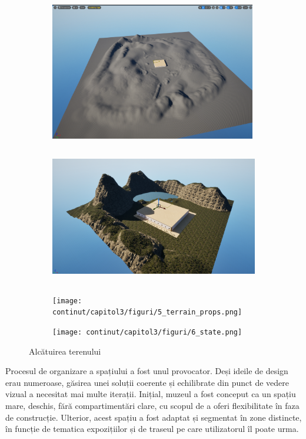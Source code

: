 \begin{figure}[h!]
    \centering
    \begin{subfigure}{0.49\textwidth}
        \includegraphics[width=\linewidth, height=6cm]{continut/capitol3/figuri/3_terrain_mapping.png}
        \label{fig:Terrain mapping}
    \end{subfigure}
    \hfill
    \begin{subfigure}{0.49\textwidth}
        \includegraphics[width=\linewidth, height=6cm]{continut/capitol3/figuri/4_terrain_texture.png}
        \label{fig:Terrain mapping}
    \end{subfigure}
    \begin{subfigure}{0.49\textwidth}
        \texttt{[image: continut/capitol3/figuri/5\_terrain\_props.png]}
        \label{fig:Terrain mapping}
    \end{subfigure}
    \begin{subfigure}{0.49\textwidth}
        \texttt{[image: continut/capitol3/figuri/6\_state.png]}
        \label{fig:Terrain mapping}
    \end{subfigure}

    \caption{Alcătuirea terenului}
\end{figure}
Procesul de organizare a spațiului a fost unul provocator. Deși ideile de design erau numeroase, găsirea unei soluții coerente și echilibrate din punct de vedere vizual a necesitat mai multe iterații. Inițial, muzeul a fost conceput ca un spațiu mare, deschis, fără compartimentări clare, cu scopul de a oferi flexibilitate în faza de construcție. Ulterior, acest spațiu a fost adaptat și segmentat în zone distincte, în funcție de tematica expozițiilor și de traseul pe care utilizatorul îl poate urma.

